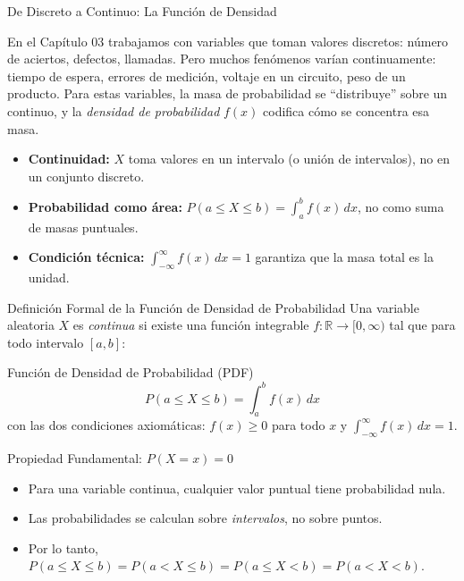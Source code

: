 \documentclass[10pt, aspectratio=169]{beamer}
\begin{document}
\begin{frame}{De Discreto a Continuo: La Función de Densidad}
  \footnotesize
  \begin{motivacion}
    En el Capítulo 03 trabajamos con variables que toman valores discretos: número de aciertos, defectos, llamadas. Pero muchos fenómenos varían continuamente: tiempo de espera, errores de medición, voltaje en un circuito, peso de un producto. Para estas variables, la masa de probabilidad se ``distribuye'' sobre un continuo, y la \emph{densidad de probabilidad} $f(x)$ codifica cómo se concentra esa masa.
  \end{motivacion}

  \vspace{0.15cm}
  \pause
  \begin{itemize}\itemsep=0.1cm
    \item \textbf{Continuidad:} $X$ toma valores en un intervalo (o unión de intervalos), no en un conjunto discreto. \pause
    \item \textbf{Probabilidad como área:} $P(a \le X \le b) = \int_{a}^{b} f(x)\,dx$, no como suma de masas puntuales. \pause
    \item \textbf{Condición técnica:} $\int_{-\infty}^{\infty} f(x)\,dx = 1$ garantiza que la masa total es la unidad.
  \end{itemize}
\end{frame}

\begin{frame}{Definición Formal de la Función de Densidad de Probabilidad}
  \footnotesize
  Una variable aleatoria $X$ es \emph{continua} si existe una función integrable $f: \mathbb{R} \to [0, \infty)$ tal que para todo intervalo $[a, b]$: \pause

  \vspace{0.1cm}
  \begin{block}{Función de Densidad de Probabilidad (PDF)}
    $$P(a \le X \le b) = \int_{a}^{b} f(x)\,dx$$
    con las dos condiciones axiomáticas: $f(x) \ge 0$ para todo $x$ y $\int_{-\infty}^{\infty} f(x)\,dx = 1$.
  \end{block}

  \vspace{0.1cm}
  \pause
  \begin{alertblock}{Propiedad Fundamental: $P(X = x) = 0$}
    \begin{itemize}\itemsep=0.05cm
      \item Para una variable continua, cualquier valor puntual tiene probabilidad nula.
      \item Las probabilidades se calculan sobre \emph{intervalos}, no sobre puntos.
      \item Por lo tanto, $P(a \le X \le b) = P(a < X \le b) = P(a \le X < b) = P(a < X < b)$.
    \end{itemize}
  \end{alertblock}
\end{frame}
\end{document}

